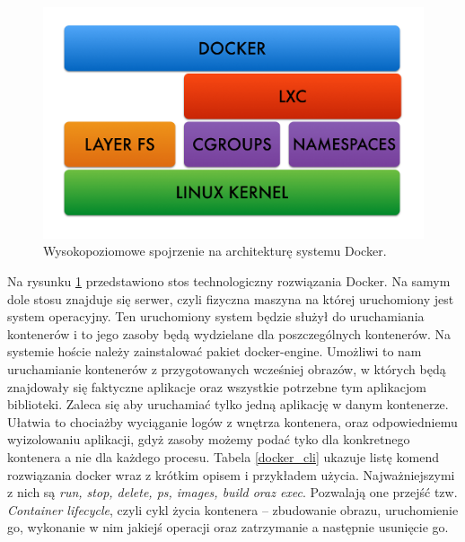 \documentclass[10pt,a4paper,titlepage,twoside]{report}
\begin{document}
\begin{figure}[ht!]
	\centering
	\includegraphics[scale=0.7]{pics/docker_arch.png}
	\caption{Wysokopoziomowe spojrzenie na architekturę systemu Docker.}
	\label{docker_arch}
\end{figure}

Na rysunku \ref{docker_arch} przedstawiono stos technologiczny rozwiązania Docker. Na samym dole stosu znajduje się serwer, czyli fizyczna maszyna na której uruchomiony jest system operacyjny. Ten uruchomiony system będzie służył do uruchamiania kontenerów i to jego zasoby będą wydzielane dla poszczególnych kontenerów. Na systemie hoście należy zainstalować pakiet docker-engine. Umożliwi to nam uruchamianie kontenerów z przygotowanych wcześniej obrazów, w których będą znajdowały się faktyczne aplikacje oraz wszystkie potrzebne tym aplikacjom biblioteki. Zaleca się aby uruchamiać tylko jedną aplikację w danym kontenerze. Ułatwia to chociażby wyciąganie logów z wnętrza kontenera, oraz odpowiedniemu wyizolowaniu aplikacji, gdyż zasoby możemy podać tyko dla konkretnego kontenera a nie dla każdego procesu. Tabela \ref{docker_cli} ukazuje listę komend rozwiązania docker wraz z krótkim opisem i przykładem użycia. Najważniejszymi z nich są \textit{run, stop, delete, ps, images, build oraz exec}. Pozwalają one przejść tzw. \textit{Container lifecycle}, czyli cykl życia kontenera – zbudowanie obrazu, uruchomienie go, wykonanie w nim jakiejś operacji oraz zatrzymanie a następnie usunięcie go.
\end{document}
